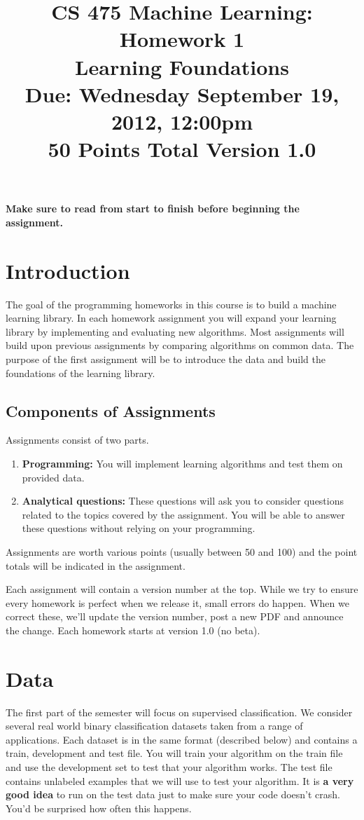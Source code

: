 \documentclass[11pt]{article}
\title{CS 475 Machine Learning: Homework 1\\Learning Foundations\\
\Large{Due: Wednesday September 19, 2012, 12:00pm}\\
50 Points Total \hspace{1cm} Version 1.0}
\author{}
\date{}
\begin{document}
\large
\maketitle
\thispagestyle{headings}

\vspace{-.5in}

{\bf Make sure to read from start to finish before beginning the assignment.}
\section{Introduction}
The goal of the programming homeworks in this course is to build a machine learning library. In each homework assignment you will expand your learning library by implementing and evaluating new algorithms. Most assignments will build upon previous assignments by comparing algorithms on common data. The purpose of the first assignment will be to introduce the data and build the foundations of the learning library. 

\subsection{Components of Assignments}
Assignments consist of two parts.
\begin{enumerate}
\item {\bf Programming:} You will implement learning algorithms and test them on provided data.
\item {\bf Analytical questions:} These questions will ask you to consider questions related to the topics covered by the assignment. You will be able to answer these questions without relying on your programming.
\end{enumerate}

Assignments are worth various points (usually between 50 and 100) and the point totals will be indicated in the assignment.

Each assignment will contain a version number at the top. While we try to ensure every homework is perfect when we release it, small errors do happen. When we correct these, we'll update the version number, post a new PDF and announce the change. Each homework starts at version 1.0 (no beta).

\section{Data}
The first part of the semester will focus on supervised classification. We consider several real world binary classification datasets taken from a range of applications. Each dataset is in the same format (described below) and contains a train, development and test file. You will train your algorithm on the train file and use the development set to test that your algorithm works. The test file contains unlabeled examples that we will use to test your algorithm. It is {\bf a very good idea} to run on the test data just to make sure your code doesn't crash. You'd be surprised how often this happens.
\end{document}
